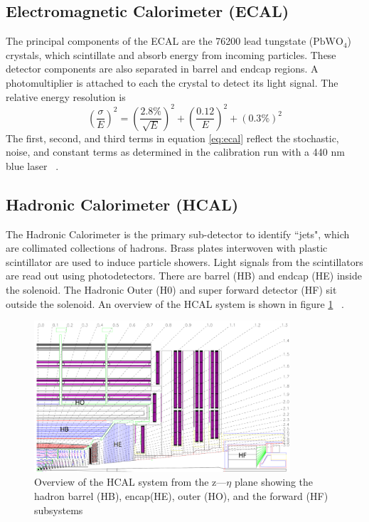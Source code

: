 \subsection{Electromagnetic Calorimeter (ECAL)}

The principal components of the ECAL are the 76200 lead tungstate ($\text{PbWO}_4$) crystals, which scintillate and absorb energy from incoming particles. These detector components are also separated in barrel and endcap regions. A photomultiplier is attached to each the crystal to detect its light signal. The relative energy resolution is 
\begin{equation*}
\label{eq:ecal}
\left(\frac{\sigma}{E}\right)^2 = \left( \frac{2.8\%}{\sqrt{E}}  \right)^2 + \left( \frac{0.12}{E}  \right)^2 + (0.3\%)^2 
\end{equation*}
 The first, second, and third terms in equation \ref{eq:ecal} reflect the stochastic, noise, and constant terms as determined in the calibration run with a 440 nm blue laser ~\cite{Chatrchyan:2008zzk,Eichhorn:2112017}. 

\subsection{Hadronic Calorimeter (HCAL)} 
The Hadronic Calorimeter is the primary sub-detector to identify ``jets", which are collimated collections of hadrons. 
Brass plates interwoven with plastic scintillator are used to induce particle showers. 
Light signals from the scintillators are read out using photodetectors. %
There are barrel (HB) and endcap (HE) inside the solenoid. The Hadronic Outer (H0) and super forward detector (HF) sit outside the solenoid. An overview of the HCAL system is shown in figure \ref{fig:hcal} ~\cite{Chatrchyan:2008zzk,Eichhorn:2112017}. 

\begin{figure}[ht!b]
  \centering
\includegraphics[width=0.85\textwidth]{figures/HCAL.png}    
    \caption{\label{fig:hcal} Overview of the HCAL system from the z---$\eta$ plane showing the hadron barrel (HB), encap(HE), outer (HO), and the forward (HF) subsystems ~\cite{Chatrchyan:2008zzk}}
\end{figure}




